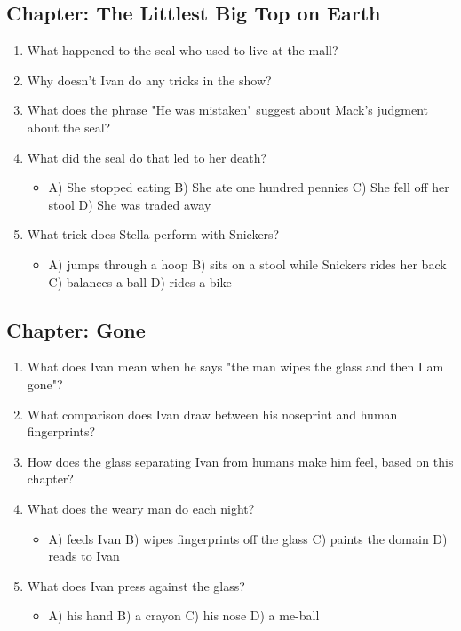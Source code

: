 \documentclass[11pt]{article}
\begin{document}
\subsection*{Chapter: The Littlest Big Top on Earth}
\begin{enumerate}
  \item What happened to the seal who used to live at the mall?
  \vspace{0.5in}
  \item Why doesn't Ivan do any tricks in the show?
  \vspace{0.5in}
  \item What does the phrase "He was mistaken" suggest about Mack's judgment about the seal?
  \vspace{0.5in}
  \item What did the seal do that led to her death?
  \begin{itemize}\setlength\itemsep{0pt}
    \item[] A) She stopped eating \quad B) She ate one hundred pennies \quad C) She fell off her stool \quad D) She was traded away
  \end{itemize}
  \item What trick does Stella perform with Snickers?
  \begin{itemize}\setlength\itemsep{0pt}
    \item[] A) jumps through a hoop \quad B) sits on a stool while Snickers rides her back \quad C) balances a ball \quad D) rides a bike
  \end{itemize}
\end{enumerate}

\subsection*{Chapter: Gone}
\begin{enumerate}
  \item What does Ivan mean when he says "the man wipes the glass and then I am gone"?
  \vspace{0.5in}
  \item What comparison does Ivan draw between his noseprint and human fingerprints?
  \vspace{0.5in}
  \item How does the glass separating Ivan from humans make him feel, based on this chapter?
  \vspace{0.5in}
  \item What does the weary man do each night?
  \begin{itemize}\setlength\itemsep{0pt}
    \item[] A) feeds Ivan \quad B) wipes fingerprints off the glass \quad C) paints the domain \quad D) reads to Ivan
  \end{itemize}
  \item What does Ivan press against the glass?
  \begin{itemize}\setlength\itemsep{0pt}
    \item[] A) his hand \quad B) a crayon \quad C) his nose \quad D) a me-ball
  \end{itemize}
\end{enumerate}
\end{document}
